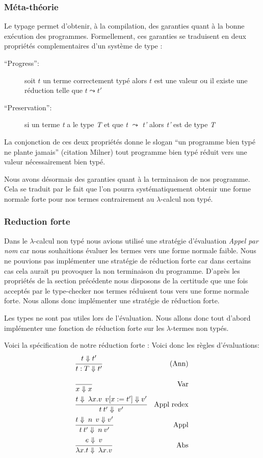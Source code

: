 \documentclass {article}
\theoremstyle{definition}
\theoremstyle{remark}
\begin{document}
\subsubsection{Méta-théorie}

Le typage permet d'obtenir, à la compilation, des garanties quant à la
bonne exécution des programmes.  Formellement, ces garanties se traduisent en deux propriétés complementaires d'un système de type :
\begin{description}
\item[``Progress'':] soit \(t\) un terme correctement typé alors \(t\) est une valeur ou il
 existe une réduction telle que \(t \leadsto t'\)
\item[``Preservation'':] si un terme \emph{t} a le type \emph{T}
et que \emph{t} $\leadsto$ \emph{t'} alors \emph{t'} est de type \emph{T}
\end{description}

La conjonction de ces deux propriétés donne le slogan 
``un programme bien typé ne plante jamais'' (citation Milner)  
tout programme bien typé réduit vers une valeur nécessairement bien typé. 

Nous avons désormais des garanties quant à la terminaison de nos programme.
Cela se traduit par le fait que l'on pourra systématiquement obtenir une 
forme normale forte pour nos termes contrairement au \(\lambda\)-calcul non typé.


\subsubsection{Reduction forte}

\label{reduction_forte}
Dans le \(\lambda\)-calcul non typé nous avions utilisé une stratégie d'évaluation \emph{Appel par nom}
car nous souhaitions évaluer les termes vers une forme normale faible. Nous ne pouvions pas implémenter 
une stratégie de réduction forte car dans certains cas cela aurait pu provoquer la non terminaison du 
programme.
D'après les propriétés de la section précédente nous disposons de la certitude que une fois 
acceptés par le type-checker nos termes réduisent tous vers une forme normale forte.
Nous allons donc implémenter une stratégie de réduction forte.

Les types ne sont pas utiles lors de l'évaluation. Nous allons donc tout d'abord implémenter
une fonction de réduction forte sur les \(\lambda\)-termes non typés.

Voici la spécification de notre réduction forte :
Voici donc les règles d'évaluations:
\begin{align*}
  &\cfrac{t \Downarrow t'}
  {t:T \Downarrow t'}&\mbox{(Ann)}&\: \\
  &\cfrac{}
  {x \Downarrow x}&\mbox{Var} \\
  &\cfrac{t \Downarrow \: \lambda x.v \:\: v[x := t']\Downarrow v'}
  {t\:t'\Downarrow \: v'}&\mbox{Appl redex} \\
  &\cfrac{t \Downarrow \: n \:\: v \Downarrow v'}
  {t\:t'\Downarrow \: n \: v'}&\mbox{Appl} \\
  &\cfrac{e \Downarrow \: v}
  {\lambda x.t \Downarrow \: \lambda x.v}&\mbox{Abs}
\end{align*}
\end{document}
